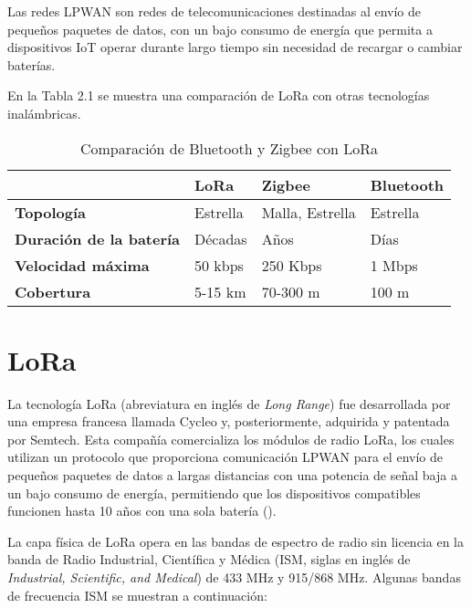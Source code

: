 \vspace{0.5cm}

Las redes LPWAN son redes de telecomunicaciones destinadas al envío de pequeños paquetes de datos, con un bajo consumo de energía que permita a dispositivos IoT operar durante largo tiempo sin necesidad de recargar o cambiar baterías.

\vspace{0.5cm}

En la Tabla 2.1 se muestra una comparación de LoRa con otras tecnologías inalámbricas.

\begin{table}[h!]
    \centering
    \caption{Comparación de Bluetooth y Zigbee con LoRa}
    \begin{tabular}{p{6cm}p{3cm}p{3cm}p{3cm}}
        \toprule
        \textbf{} & \textbf{LoRa} & \textbf{Zigbee} & \textbf{Bluetooth} \\
        \midrule
        \textbf{Topología} & Estrella & Malla, Estrella & Estrella \\
        \textbf{Duración de la batería} & Décadas & Años & Días \\
        \textbf{Velocidad máxima} & 50 kbps & 250 Kbps & 1 Mbps \\
        \textbf{Cobertura} & 5-15 km & 70-300 m & 100 m \\
        \bottomrule
    \end{tabular}
    \label{tab:comparison}
\end{table}

\section{LoRa}

La tecnología LoRa (abreviatura en inglés de \textit{Long Range}) fue desarrollada por una empresa francesa llamada Cycleo y, posteriormente, adquirida y patentada por Semtech. Esta compañía comercializa los módulos de radio LoRa, los cuales utilizan un protocolo que proporciona comunicación LPWAN para el envío de pequeños paquetes de datos a largas distancias con una potencia de señal baja a un bajo consumo de energía, permitiendo que los dispositivos compatibles funcionen hasta 10 años con una sola batería (\cite{augustin2016}).

\vspace{0.5cm}

La capa física de LoRa opera en las bandas de espectro de radio sin licencia en la banda de Radio Industrial, Científica y Médica (ISM, siglas en inglés de \textit{Industrial, Scientific, and Medical}) de 433 MHz y 915/868 MHz. Algunas bandas de frecuencia ISM se muestran a continuación:

